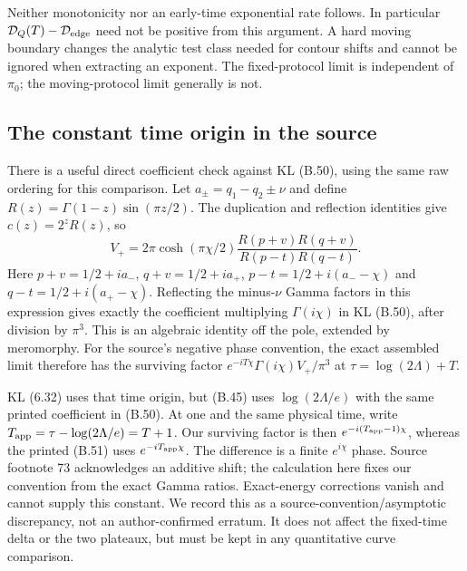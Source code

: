 Neither monotonicity nor an early-time exponential rate follows. In
particular $\mathcal D_Q(T)-\mathcal D_{\rm edge}$ need not be positive
from this argument. A hard moving boundary changes the analytic test
class needed for contour shifts and cannot be ignored when extracting
an exponent. The fixed-protocol limit is independent of $\pi_0$;
the moving-protocol limit generally is not.

\subsection{The constant time origin in the source}
There is a useful direct coefficient check against KL (B.50), using
the same raw ordering for this comparison. Let
$a_\pm=q_1-q_2\pm\nu$ and define $R(z)=\Gamma(1-z)\sin(\pi z/2)$.
The duplication and reflection identities give $c(z)=2^zR(z)$, so
\begin{equation}
 V_+=2\pi\cosh(\pi\chi/2)
 \frac{R(p+v)R(q+v)}{R(p-t)R(q-t)}.
 \label{eq:logtime-origin-identity}
\end{equation}
Here $p+v=1/2+ia_-$, $q+v=1/2+ia_+$,
$p-t=1/2+i(a_--\chi)$ and $q-t=1/2+i(a_+-\chi)$.
Reflecting the minus-$\nu$ Gamma factors in this expression gives
exactly the coefficient multiplying $\Gamma(i\chi)$ in KL (B.50),
after division by $\pi^3$. This is an algebraic identity off the pole,
extended by meromorphy. For the source's negative phase convention,
the exact assembled limit therefore has the surviving factor
$e^{-iT\chi}\Gamma(i\chi)V_+/\pi^3$ at
$\tau=\log(2\Lambda)+T$.

KL (6.32) uses that time origin, but (B.45) uses
$\log(2\Lambda/e)$ with the same printed coefficient in (B.50).
At one and the same physical time, write
$T_{\rm app}=\tau-\log(2\Lambda/e)=T+1$.
Our surviving factor is then $e^{-i(T_{\rm app}-1)\chi}$, whereas the
printed (B.51) uses $e^{-iT_{\rm app}\chi}$. The difference is a finite
$e^{i\chi}$ phase. Source footnote 73 acknowledges an additive shift;
the calculation here fixes our convention from the exact Gamma ratios.
Exact-energy corrections vanish and cannot supply this constant. We
record this as a source-convention/asymptotic discrepancy, not an
author-confirmed erratum. It does not affect the fixed-time delta or
the two plateaux, but must be kept in any quantitative curve comparison.

